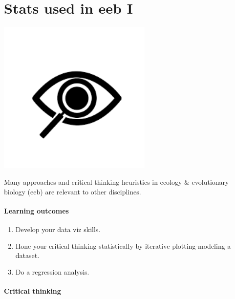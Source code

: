 \documentclass[
]{book}
\providecommand{\tightlist}{%
  \setlength{\itemsep}{0pt}\setlength{\parskip}{0pt}}
\begin{document}
\hypertarget{eebI}{%
\chapter{Stats used in eeb I}\label{eebI}}

\includegraphics[width=3in,height=\textheight]{./eebI.png}

Many approaches and critical thinking heuristics in ecology \& evolutionary biology (eeb) are relevant to other disciplines.

\hypertarget{learning-outcomes-3}{%
\subsubsection*{Learning outcomes}\label{learning-outcomes-3}}

\begin{enumerate}
\def\labelenumi{\arabic{enumi}.}
\tightlist
\item
  Develop your data viz skills.\\
\item
  Hone your critical thinking statistically by iterative plotting-modeling a dataset.\\
\item
  Do a regression analysis.
\end{enumerate}

\hypertarget{critical-thinking-2}{%
\subsubsection*{Critical thinking}\label{critical-thinking-2}}
\end{document}
